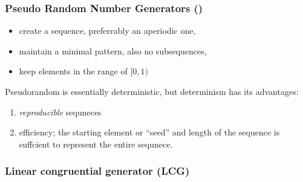 
\begin{frame}\frametitle{\textbf{Pseudo} Random Number Generators (\subsecname)}


\begin{itemize}
\item create a sequence, preferrably an aperiodic one,
\item maintain a minimal pattern, also no subsequences,
\item keep elements in the range of $\lbrack0, 1)$
\end{itemize}

\pause

\svspace{5mm}

Pseudorandom is essentially deterministic, but determinism has its advantages:
\begin{enumerate}
	\item \emph{reproducible} sequneces
	\item efficiency; the starting element or ``seed'' and length of the sequence is suffcient to represent the entire sequnece.
\end{enumerate}

\end{frame}

\subsubsection{Linear congruential generator (LCG)}

